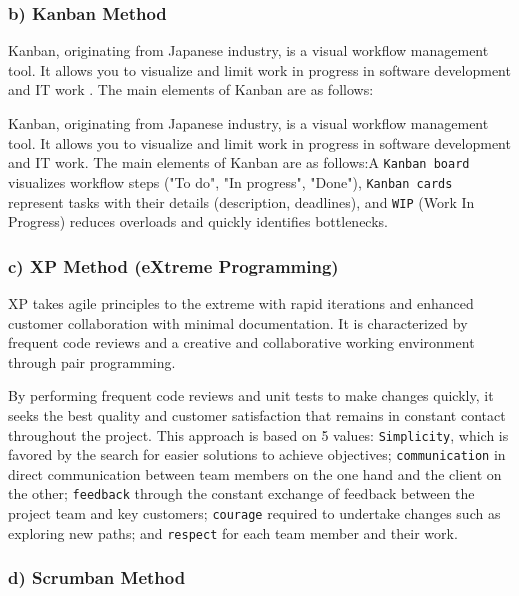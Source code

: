 \subsubsection{b) Kanban Method}
Kanban, originating from Japanese industry, is a visual workflow management tool. It allows you to visualize and limit work in progress in software development and IT work . The main elements of Kanban are as follows:

Kanban, originating from Japanese industry, is a visual workflow management tool. It allows you to visualize and limit work in progress in software development and IT work\cite{anderson2010kanban}. The main elements of Kanban are as follows:A \texttt{Kanban board} visualizes workflow steps ("To do", "In progress", "Done"), \texttt{Kanban cards} represent tasks with their details (description, deadlines), and \texttt{WIP} (Work In Progress) reduces overloads and quickly identifies bottlenecks.

\subsubsection{c) XP Method (eXtreme Programming)}

XP takes agile principles to the extreme with rapid iterations and enhanced customer collaboration with minimal documentation. It is characterized by frequent code reviews and a creative and collaborative working environment through pair programming\cite{beck2000extreme}. 


By performing frequent code reviews and unit tests to make changes quickly, it seeks the best quality and customer satisfaction that remains in constant contact throughout the project. This approach is based on 5 values: \texttt{Simplicity}, which is favored by the search for easier solutions to achieve objectives; \texttt{communication} in direct communication between team members on the one hand and the client on the other; \texttt{feedback} through the constant exchange of feedback between the project team and key customers; \texttt{courage} required to undertake changes such as exploring new paths; and \texttt{respect} for each team member and their work.


\subsubsection{d) Scrumban Method}

